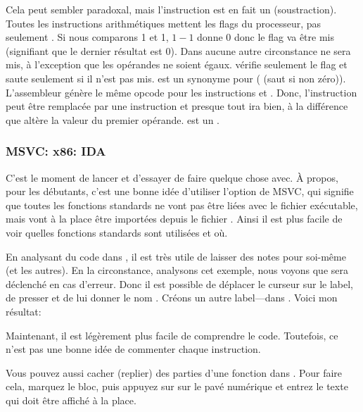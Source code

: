 \label{CMPandSUB} 
Cela peut sembler paradoxal, mais l'instruction \CMP est en fait un \SUB (soustraction).
Toutes les instructions arithmétiques mettent les flags du processeur, pas seulement \CMP.
Si nous comparons 1 et 1, $1-1$ donne 0 donc le flag \ZF va être mis (signifiant
que le dernier résultat est 0).
Dans aucune autre circonstance \ZF ne sera mis, à l'exception que les opérandes
ne soient égaux.
\JNE vérifie seulement le flag \ZF et saute seulement si il n'est pas mis. \JNE
est un synonyme pour \JNZ ( (saut si non zéro)).
L'assembleur génère le même opcode pour les instructions \JNE et \JNZ.
Donc, l'instruction \CMP peut être remplacée par une instruction \SUB et presque
tout ira bien, à la différence que \SUB altère la valeur du premier opérande.
\CMP est un .

\subsubsection{MSVC: x86: IDA}

C'est le moment de lancer \IDA et d'essayer de faire quelque chose avec.
À propos, pour les débutants, c'est une bonne idée d'utiliser l'option 
de MSVC, qui signifie que toutes les fonctions standards ne vont pas être liées
avec le fichier exécutable, mais vont à la place être importées depuis le fichier
.
Ainsi il est plus facile de voir quelles fonctions standards sont utilisées et où.

En analysant du code dans \IDA, il est très utile de laisser des notes pour soi-même
(et les autres).
En la circonstance, analysons cet exemple, nous voyons que  sera déclenché
en cas d'erreur.
Donc il est possible de déplacer le curseur sur le label, de presser  et de
lui donner le nom .
Créons un autre label---dans .
Voici mon résultat:



Maintenant, il est légèrement plus facile de comprendre le code.
Toutefois, ce n'est pas une bonne idée de commenter chaque instruction.

Vous pouvez aussi cacher (replier) des parties d'une fonction dans \IDA.
Pour faire cela, marquez le bloc, puis appuyez sur \q{--} sur le pavé numérique et
entrez le texte qui doit être affiché à la place.

